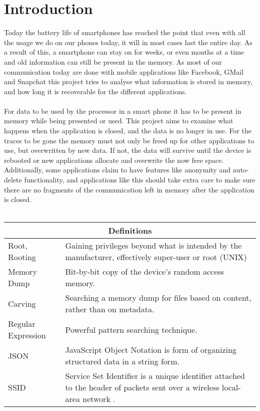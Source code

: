 \section{Introduction}
Today the battery life of smartphones has reached the point that even with all the usage we do on our phones today, it will in most cases last the entire day. As a result of this, a smartphone can stay on for weeks, or even months at a time and old information can still be present in the memory. As most of our communication today are done with mobile applications like Facebook, GMail and Snapchat this project tries to analyse what information is stored in memory, and how long it is recoverable for the different applications. \\ \\
For data to be used by the processor in a smart phone it has to be present in memory while being presented or used. This project aims to examine what happens when the application is closed, and the data is no longer in use. For the traces to be gone the memory must not only be freed up for other applications to use, but overwritten by new data. If not, the data will survive until the device is rebooted or new applications allocate and overwrite the now free space. Additionally, some applications claim to have features like anonymity and auto-delete functionality, and applications like this should take extra care to make sure there are no fragments of the communication left in memory after the application is closed.
\\ \\
\begin{tabular}{ |p{3cm}|p{4.5cm}|  }
 \hline
 \multicolumn{2}{|c|}{\textbf{Definitions}} \\
 \hline
 Root, Rooting&Gaining privileges beyond what is intended by the manufacturer, effectively super-user or root (UNIX) \\
 \hline
  Memory Dump& Bit-by-bit copy of the device's random access memory.\\
 \hline
 Carving& Searching a memory dump for  files based on content, rather than on metadata.\\
 \hline
 Regular Expression & Powerful pattern searching technique.\\
 \hline
 JSON & JavaScript Object Notation is form of organizing structured data in a string form.\\
 \hline
 SSID & Service Set Identifier is a unique identifier attached to the header of packets sent over a wireless local-area network .\\
 \hline
\end{tabular}

\clearpage